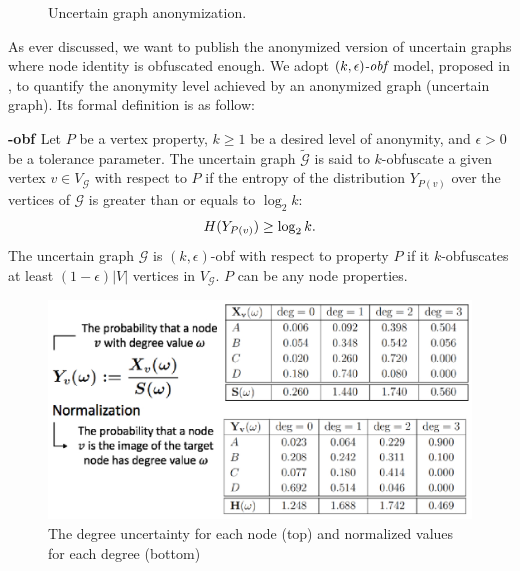 {\begin{figure}[!t]
\begin{subfigure}[t]{0.4\textwidth}
    \end{subfigure}
    \caption{Uncertain graph anonymization.}
    \label{fig:augExample}
\end{figure}
As ever discussed, we want to publish the anonymized version of uncertain graphs where node identity is obfuscated enough. We adopt $\textit{$(k,\epsilon)$-obf}$ model, proposed in \cite{Bonchi_Identity_2014}, to quantify the anonymity level achieved by an anonymized graph (uncertain graph).
Its formal definition is as follow: 
\begin{definition}
    \textbf{-obf \cite{Bonchi_Identity_2014}}
    Let $P$ be a vertex property, $k \geq 1$ be a desired level of anonymity, and $\epsilon >0 $ be a tolerance parameter. The uncertain graph $\tilde{\mathcal{G}}$ is said to $k$-obfuscate a given vertex $v \in V_{\mathcal{G}}$ with respect to $P$ if the entropy of the distribution $Y_{P(v)}$ over the vertices of $\mathcal{G}$ is greater than or equals to $\log_{2}{k}$:
    \vj
    \begin{equation*}
        H(Y_{P(v)}) \geq \log_{2}{k}.
    \label{obfCon}
    \svj
    \end{equation*}
The uncertain graph $\mathcal{G}$ is $(k,\epsilon)$-obf with respect to property $P$ if it $k$-obfuscates at least $(1-\epsilon)|V|$ vertices in $V_{\mathcal{G}}$. $P$ can be any node properties.  
\end{definition}

\begin{figure}[t]
        \centering    
        \includegraphics[scale=0.8]{figures/DegreeAUG/entropyEx.eps}
        \caption{The degree uncertainty for each node (top) and normalized values for each degree (bottom)}
    \label{fig:entropyExample}
\end{figure}

}
